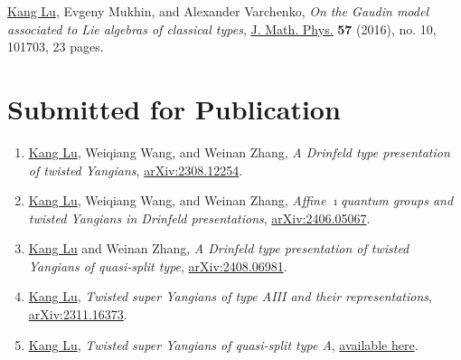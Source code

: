 \documentclass[11pt,letterpaper,roman,colorlinks,urlcolor=blue,linkcolor=blue
]{moderncv}
\begin{document}
\begin{etaremune}[leftmargin=1.17cm]
\item \underline{Kang Lu}, Evgeny Mukhin, and Alexander Varchenko, {\textit{On the Gaudin model associated to Lie algebras of classical types}}, \href{https://doi.org/10.1063/1.4964389}{J. Math. Phys.} {\textbf{57}} (2016), no. 10, 101703, 23 pages.
\end{etaremune}
        
\section{Submitted for Publication}

\begin{enumerate}[leftmargin=1.17cm]


\item \underline{Kang Lu}, Weiqiang Wang, and Weinan Zhang, {\textit{A Drinfeld type presentation of twisted Yangians}}, \href{https://arxiv.org/abs/2308.12254}{arXiv:2308.12254}. 

\item \underline{Kang Lu}, Weiqiang Wang, and Weinan Zhang, {\textit{Affine 
$\imath$quantum groups and twisted Yangians in Drinfeld presentations}}, \href{https://arxiv.org/abs/2406.05067}{arXiv:2406.05067}.

\item \underline{Kang Lu} and Weinan Zhang, {\textit{A Drinfeld type presentation of twisted Yangians of quasi-split type}}, \href{https://arxiv.org/abs/2408.06981}{arXiv:2408.06981}.

\item \underline{Kang Lu}, {\textit{Twisted super Yangians of type AIII and their representations}}, \href{https://arxiv.org/abs/2311.16373}{arXiv:2311.16373}.


\item \underline{Kang Lu}, {\textit{Twisted super Yangians of quasi-split type A}}, \href{https://kanglu.me/writings/Twisted_super_Yangians_of_quasi-split_type_A.pdf}{available here}.




\end{enumerate}
\end{document}
